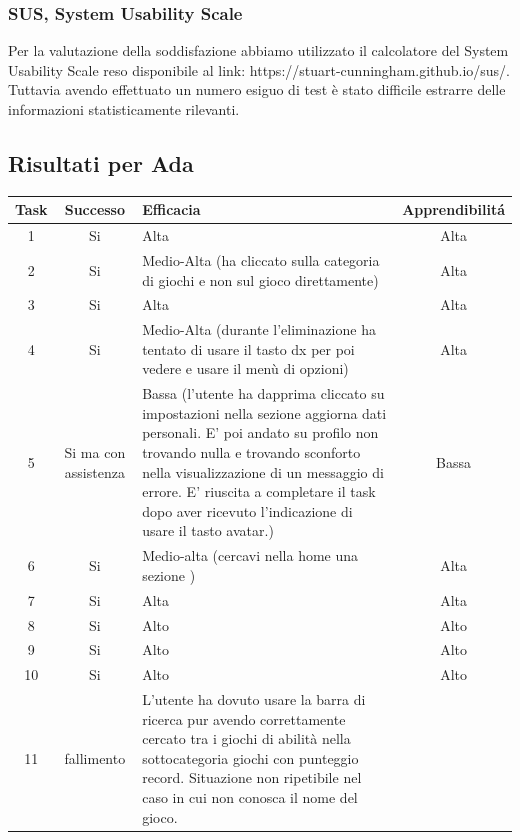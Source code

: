 \documentclass[../Report.tex]{subfiles}
\begin{document}
    \subsubsection{SUS, System Usability Scale}
    Per la valutazione della soddisfazione abbiamo utilizzato il calcolatore del System Usability Scale reso disponibile al link: https://stuart-cunningham.github.io/sus/. Tuttavia avendo effettuato un numero esiguo di test è stato difficile estrarre delle informazioni statisticamente rilevanti.

    \subsection{Risultati per Ada}
    \begin{table}[H]
        \begin{tabular}{|c|c|p{5cm}|c|}
            \hline
            Task & Successo & Efficacia & Apprendibilitá \\
            \hline
            1 & Si & Alta & Alta \\
            \hline
            2 & Si & Medio-Alta (ha cliccato sulla categoria di giochi e non sul gioco direttamente) & Alta \\
            \hline
            3 & Si & Alta & Alta \\
            \hline
            4 & Si & Medio-Alta (durante l'eliminazione ha tentato di usare il tasto dx per poi vedere e usare il menù di opzioni) & Alta \\
            \hline
            5 & Si ma con assistenza & Bassa (l’utente ha dapprima cliccato su impostazioni nella sezione aggiorna dati personali. E’ poi andato su profilo non trovando nulla e trovando sconforto nella visualizzazione di un messaggio di errore. E’ riuscita a completare il task dopo aver ricevuto l’indicazione di usare il tasto avatar.) & Bassa \\
            \hline
            6 & Si & Medio-alta (cercavi nella home una sezione ) & Alta \\
            \hline
            7 & Si & Alta & Alta \\
            \hline
            8 & Si & Alto & Alto \\
            \hline
            9 & Si & Alto & Alto \\
            \hline
            10 & Si & Alto & Alto \\
            \hline
            11 & fallimento & L’utente ha dovuto usare la barra di ricerca pur avendo correttamente cercato tra i giochi di abilità nella sottocategoria giochi con punteggio record. Situazione non ripetibile nel caso in cui non conosca il nome del gioco.  & \\
            \hline
        \end{tabular}
    \end{table}
\end{document}
